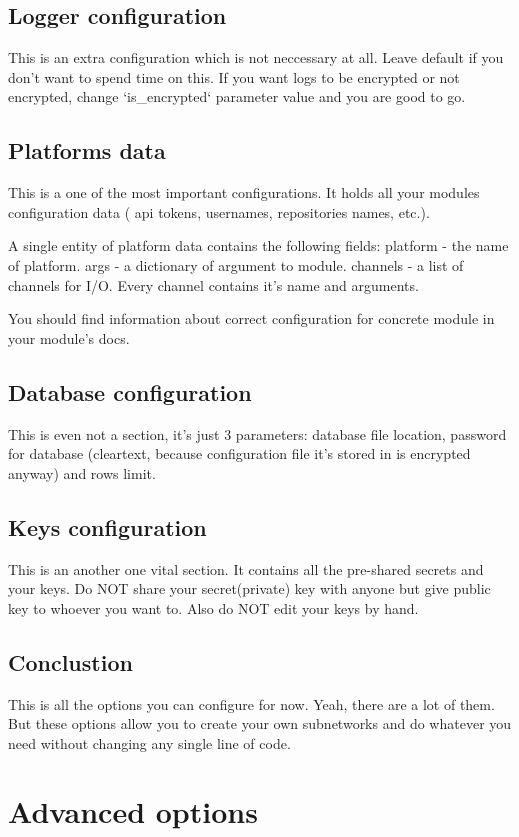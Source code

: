 \documentclass{article}
\begin{document}
	\subsection{Logger configuration}
	This is an extra configuration which is not neccessary at all. Leave default if you don't want
	to spend time on this. If you want logs to be encrypted or not encrypted, change `is\_encrypted`
	parameter value and you are good to go.

	\subsection{Platforms data}
	This is a one of the most important configurations. It holds all your modules configuration data (
	api tokens, usernames, repositories names, etc.).

	A single entity of platform data contains the following fields:
	platform - the name of platform.
	args - a dictionary of argument to module.
	channels - a list of channels for I/O. Every channel contains it's name and arguments.
	
	You should find information about correct configuration for concrete module
	in your module's docs.

	\subsection{Database configuration}
	This is even not a section, it's just 3 parameters: database file location, password for
	database (cleartext, because configuration file it's stored in is encrypted anyway)
	and rows limit.

	\subsection{Keys configuration}
	This is an another one vital section. It contains all the pre-shared secrets and your keys.
	Do NOT share your secret(private) key with anyone but give public key to whoever you want to.
	Also do NOT edit your keys by hand.

	\subsection{Conclustion}
	This is all the options you can configure for now. Yeah, there are a lot of them. But these options allow
	you to create your own subnetworks and do whatever you need without changing any single line of code.


\section{Advanced options}
\end{document}
